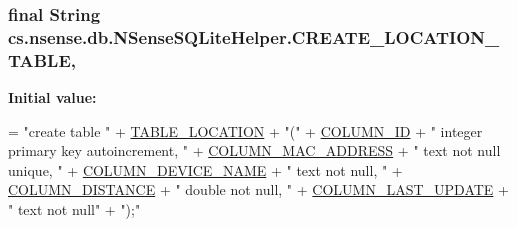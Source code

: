 \hypertarget{classcs_1_1nsense_1_1db_1_1_n_sense_s_q_lite_helper_ae9ea9679888a8bd8630020c81d3c9394}{
\subsubsection[{C\-R\-E\-A\-T\-E\-\_\-\-L\-O\-C\-A\-T\-I\-O\-N\-\_\-\-T\-A\-B\-L\-E}]{\setlength{\rightskip}{0pt plus 5cm}final String cs.\-nsense.\-db.\-N\-Sense\-S\-Q\-Lite\-Helper.\-C\-R\-E\-A\-T\-E\-\_\-\-L\-O\-C\-A\-T\-I\-O\-N\-\_\-\-T\-A\-B\-L\-E\hspace{0.3cm}{\ttfamily [static]}, {\ttfamily [private]}}}\label{classcs_1_1nsense_1_1db_1_1_n_sense_s_q_lite_helper_ae9ea9679888a8bd8630020c81d3c9394}
{\bfseries Initial value\-:}
\begin{DoxyCode}
= \textcolor{stringliteral}{"create table "}
            + \hyperlink{classcs_1_1nsense_1_1db_1_1_n_sense_s_q_lite_helper_aa965679492becc56e3848f41083401f5}{TABLE\_LOCATION} + \textcolor{stringliteral}{"("}
            + \hyperlink{classcs_1_1nsense_1_1db_1_1_n_sense_s_q_lite_helper_a42c92e67b4392524cb4f6bf4c4da4c79}{COLUMN\_ID} + \textcolor{stringliteral}{" integer primary key autoincrement, "}
            + \hyperlink{classcs_1_1nsense_1_1db_1_1_n_sense_s_q_lite_helper_ab71ac3b7f6963ff8e77345776010b45a}{COLUMN\_MAC\_ADDRESS} + \textcolor{stringliteral}{" text not null unique, "}
            + \hyperlink{classcs_1_1nsense_1_1db_1_1_n_sense_s_q_lite_helper_a56f69b02d8da96e6d5657ac6184c05f2}{COLUMN\_DEVICE\_NAME} + \textcolor{stringliteral}{" text not null, "}
            + \hyperlink{classcs_1_1nsense_1_1db_1_1_n_sense_s_q_lite_helper_afbaabae4c4f5eec5518306c84b72b6e0}{COLUMN\_DISTANCE} + \textcolor{stringliteral}{" double not null, "}
            + \hyperlink{classcs_1_1nsense_1_1db_1_1_n_sense_s_q_lite_helper_a2ef74045c1e5eef600940407e7da7080}{COLUMN\_LAST\_UPDATE} + \textcolor{stringliteral}{" text not null"}
            + \textcolor{stringliteral}{");"}
\end{DoxyCode}
